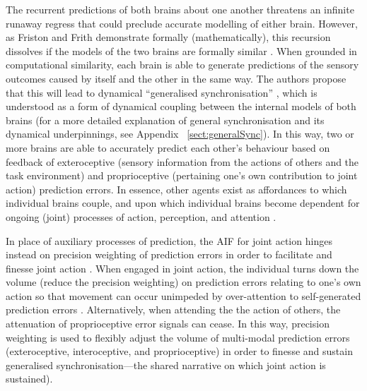 \begin{CJK}{UTF8}{gbsn}
The recurrent predictions of both brains about one another threatens an infinite runaway regress that could preclude accurate modelling of either brain.  However, as Friston and Frith demonstrate formally (mathematically), this recursion dissolves if the models of the two brains are formally similar \citep{Friston2015,Friston2015a}.  When grounded in computational similarity, each brain is able to generate predictions of the sensory outcomes caused by itself and the other in the same way.  The authors propose that this will lead to dynamical ``generalised synchronisation'' \citep{Barreto2003}, which is understood as a form of dynamical coupling between the internal models of both brains (for a more detailed explanation of general synchronisation and its dynamical underpinnings, see Appendix ~\ref{sect:generalSync}).  In this way, two or more brains are able to accurately predict each other's behaviour based on feedback of exteroceptive (sensory information from the actions of others and the task environment) and proprioceptive (pertaining one's own contribution to joint action) prediction errors.  In essence, other agents exist as affordances to which individual brains couple, and upon which individual brains become dependent for ongoing (joint) processes of action, perception, and attention \citep{Friston2015a}.

In place of auxiliary processes of prediction, the AIF for joint action hinges instead on precision weighting of prediction errors in order to facilitate and finesse joint action \citep{Friston2015}.  When engaged in joint action, the individual turns down the volume (reduce the precision weighting) on prediction errors relating to one's own action so that movement can occur unimpeded by over-attention to self-generated prediction errors \citep[an intuitive example of the opposite of this ideal scenario is a Skype call in which the flow of an individual's speech is interrupted by auditory feedback from the other receiver's device (feedback that would otherwise be attenuated by the speaker), see][]{Friston2015}.  Alternatively, when attending the the action of others, the attenuation of proprioceptive error signals can cease. In this way, precision weighting is used to flexibly adjust the volume of multi-modal prediction errors (exteroceptive, interoceptive, and proprioceptive) in order to finesse and sustain generalised synchronisation---the shared narrative on which joint action is sustained).


\end{CJK}
